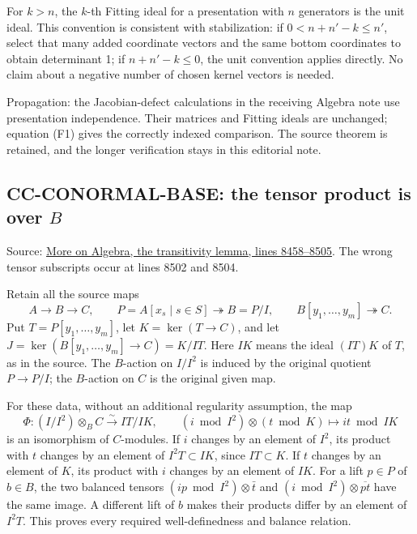 \documentclass[11pt]{article}
\begin{document}
For \(k>n\), the \(k\)-th Fitting ideal for a presentation with \(n\) generators is the unit ideal. This convention is consistent with stabilization: if \(0<n+n'-k\leq n'\), select that many added coordinate vectors and the same bottom coordinates to obtain determinant 1; if \(n+n'-k\leq0\), the unit convention applies directly. No claim about a negative number of chosen kernel vectors is needed.

Propagation: the Jacobian-defect calculations in the receiving Algebra note use presentation independence. Their matrices and Fitting ideals are unchanged; equation (F1) gives the correctly indexed comparison. The source theorem is retained, and the longer verification stays in this editorial note.

\subsection{\texorpdfstring{CC-CONORMAL-BASE: the tensor product is over \(B\)}{CC-CONORMAL-BASE: the tensor product is over B}}\label{cc-conormal-base-the-tensor-product-is-over-b}

Source: \href{https://github.com/stacks/stacks-project/blob/a04446e5\allowbreak{}7ec1fbc2\allowbreak{}52a871af\allowbreak{}cec7752f\allowbreak{}b2807b14/more-algebra.tex\#L8458}{More on Algebra, the transitivity lemma, lines 8458--8505}. The wrong tensor subscripts occur at lines 8502 and 8504.

Retain all the source maps \[
 A\longrightarrow B\longrightarrow C,\qquad
 P=A[x_s\mid s\in S]\twoheadrightarrow B=P/I,\qquad
 B[y_1,\ldots,y_m]\twoheadrightarrow C.
\] Put \(T=P[y_1,\ldots,y_m]\), let \(K=\ker(T\to C)\), and let \(J=\ker(B[y_1,\ldots,y_m]\to C)=K/IT\). Here \(IK\) means the ideal \((IT)K\) of \(T\), as in the source. The \(B\)-action on \(I/I^2\) is induced by the original quotient \(P\to P/I\); the \(B\)-action on \(C\) is the original given map.

For these data, without an additional regularity assumption, the map \[
 \Phi:(I/I^2)\otimes_B C\xrightarrow{\ \sim\ }IT/IK,
 \qquad (i\bmod I^2)\otimes(t\bmod K)\longmapsto it\bmod IK
\tag{C1}
\] is an isomorphism of \(C\)-modules. If \(i\) changes by an element of \(I^2\), its product with \(t\) changes by an element of \(I^2T\subset IK\), since \(IT\subset K\). If \(t\) changes by an element of \(K\), its product with \(i\) changes by an element of \(IK\). For a lift \(p\in P\) of \(b\in B\), the two balanced tensors \((ip\bmod I^2)\otimes\bar t\) and \((i\bmod I^2)\otimes\overline{pt}\) have the same image. A different lift of \(b\) makes their products differ by an element of \(I^2T\). This proves every required well-definedness and balance relation.
\end{document}
